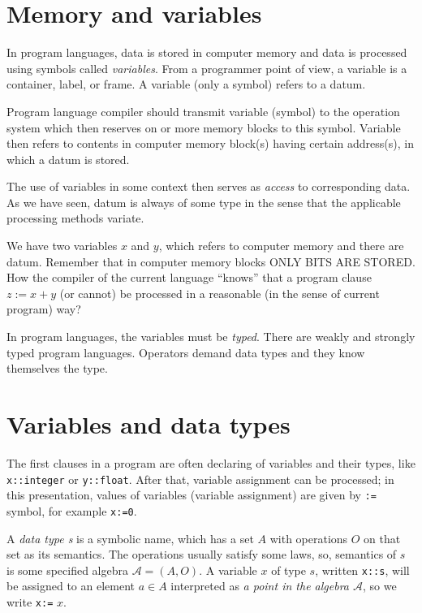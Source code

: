 \section{Memory and variables}
In program languages, data is stored in computer memory and data is processed using symbols called \emph{variables}. From a programmer point of view, a variable is a container, label, or frame. A variable (only a symbol) refers to a datum.\par 
Program language compiler should transmit variable (symbol) to the operation system which then reserves on or more memory blocks to this symbol. Variable then refers to contents in computer memory block(s) having certain address(s), in which a datum is stored.\par 
The use of variables in some context then serves as \emph{access} to corresponding data. As we have seen, datum is always of some type in the sense that the applicable processing methods variate.

\begin{example}
We have two variables $x$ and $y$, which refers to computer memory and there are datum. Remember that in computer memory blocks ONLY BITS ARE STORED. How the compiler of the current language ``knows'' that a program clause $z:=x+y$ (or cannot) be processed in a reasonable (in the sense of current program) way?
\end{example}

In program languages, the variables must be \emph{typed}. There are weakly and strongly typed program languages. \note Operators demand data types and they know themselves the type.

\section{Variables and data types}
The first clauses in a program are often declaring of variables and their types, like \verb|x::integer| or \verb|y::float|. After that, variable assignment can be processed; in this presentation, values of variables (variable assignment) are given by \verb|:=| symbol, for example \verb|x:=0|.\par 
A \emph{data type s} is a symbolic name, which has a set $A$ with operations $O$ on that set as its semantics. The operations usually satisfy some laws, so, semantics of $s$ is some specified algebra $\mathcal{A}=\left(A,O \right)$. A variable $x$ of type $s$, written \verb|x::s|, will be assigned to an element $a \in A$ interpreted as \emph{a point in the algebra $\mathcal{A}$}, so we write \verb|x:=| $x$.

